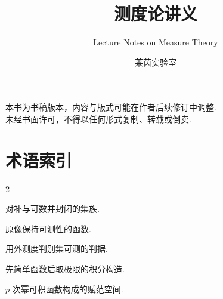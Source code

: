 \documentclass[
  trim=185x260,
  theme=000,
  bg=grid,
  fontsize=10pt
]{lonetrailbook}
\title{测度论讲义}
\subtitle{Lecture Notes on Measure Theory}
\author{莱茵实验室}
\begin{document}
\maketitle
\frontmatter

\tableofcontents
\clearpage
{\thispagestyle{empty}
\begin{center}\vspace*{\fill}
{\kaishu\fontsize{13}{22}\selectfont\color{InkMuted}
  本书为书稿版本，内容与版式可能在作者后续修订中调整.\\[1em]
  未经书面许可，不得以任何形式复制、转载或倒卖.}
\vspace*{\fill}\end{center}
\clearpage}

\mainmatter





\backmatter

\chapter*{术语索引}
\vspace{1em}
\begin{multicols}{2}\footnotesize
\begin{description}[leftmargin=1.4em,style=nextline]
  \item[$\sigma$-代数] 对补与可数并封闭的集族.
  \item[可测函数] 原像保持可测性的函数.
  \item[Carathéodory 条件] 用外测度判别集可测的判据.
  \item[Lebesgue 积分] 先简单函数后取极限的积分构造.
  \item[$L^p$ 空间] $p$ 次幂可积函数构成的赋范空间.
\end{description}
\end{multicols}

\BackCover
\end{document}
